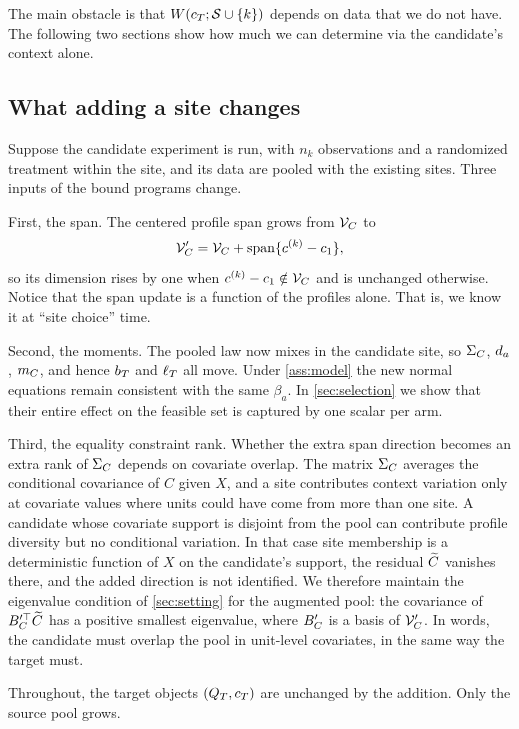The main obstacle is that $W(c_T;\mathcal S\cup\{k\})$ depends on data that
we do not have. The following two sections show how much we can determine via the candidate's context alone.

\subsection{What adding a site changes}
\label{subsec:augmentation}

Suppose the candidate experiment is run, with $n_k$ observations and a
randomized treatment within the site, and its data are pooled with the
existing sites. Three inputs of the bound programs change.

First, the span. The centered profile span grows from $\mathcal V_C$ to
\begin{equation}
  \mathcal V_C'=\mathcal V_C+\operatorname{span}\{c^{(k)}-c_1\},
  \label{eq:span-update}
\end{equation}
so its dimension rises by one when $c^{(k)}-c_1\notin\mathcal V_C$ and is
unchanged otherwise. Notice that the span update is a function of the profiles
alone. That is, we know it at ``site choice'' time.

Second, the moments. The pooled law now mixes in the candidate site, so
$\Sigma_C$, $d_{a}$, $m_C$, and hence $b_T$ and $\ell_T$ all move.
Under \cref{ass:model} the new normal equations remain consistent with
the same $\beta_a$. In \cref{sec:selection} we show that their entire
effect on the feasible set is captured by one scalar per arm.

Third, the equality constraint rank. Whether the extra span direction becomes an extra rank
of $\Sigma_C$ depends on covariate overlap. The matrix $\Sigma_C$ averages the
conditional covariance of $C$ given $X$, and a site contributes context
variation only at covariate values where units could have come from more
than one site. A candidate whose covariate support is disjoint from the pool can
contribute profile diversity but no conditional variation. In that case
site membership is a deterministic function of $X$ on the candidate's
support, the residual $\widetilde C$ vanishes there, and the added direction is
not identified. We therefore maintain the eigenvalue condition of
\cref{sec:setting} for the augmented pool: the covariance of
$B_C'^\top\widetilde C$ has a positive smallest eigenvalue, where $B_C'$
is a basis of $\mathcal V_C'$. In words, the candidate must overlap the pool
in unit-level covariates, in the same way the target must.

Throughout, the target objects $(Q_T,c_T)$ are unchanged by the addition. Only the source pool grows.
